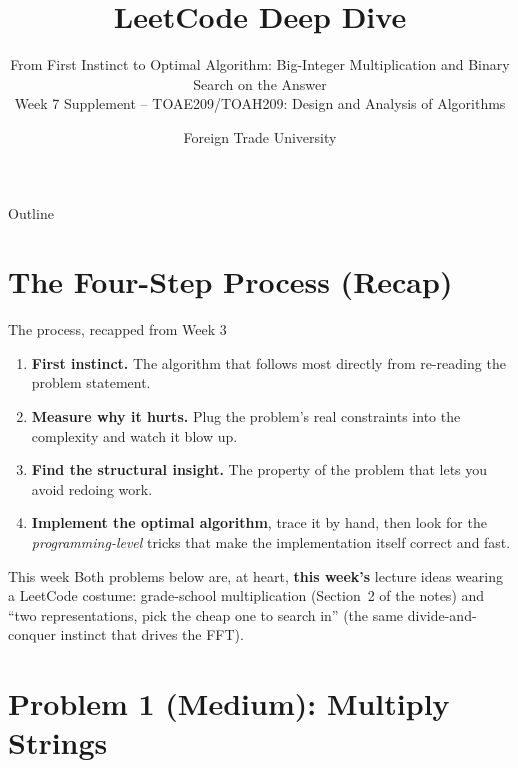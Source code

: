 \documentclass[11pt,aspectratio=169]{beamer}
\title{LeetCode Deep Dive}
\subtitle{From First Instinct to Optimal Algorithm: Big-Integer Multiplication and Binary
Search on the Answer\\
\small Week 7 Supplement -- TOAE209/TOAH209: Design and Analysis of Algorithms}
\author{Foreign Trade University}
\date{}
\begin{document}
\begin{frame}
  \titlepage
\end{frame}

\begin{frame}{Outline}
  \tableofcontents
\end{frame}

\section{The Four-Step Process (Recap)}

\begin{frame}{The process, recapped from Week 3}
  \begin{enumerate}
    \item \textbf{First instinct.} The algorithm that follows most directly from
    re-reading the problem statement.
    \item \textbf{Measure why it hurts.} Plug the problem's real constraints into the
    complexity and watch it blow up.
    \item \textbf{Find the structural insight.} The property of the problem that lets
    you avoid redoing work.
    \item \textbf{Implement the optimal algorithm}, trace it by hand, then look for the
    \emph{programming-level} tricks that make the implementation itself correct and fast.
  \end{enumerate}
  \begin{alertblock}{This week}
    Both problems below are, at heart, \textbf{this week's} lecture ideas wearing a
    LeetCode costume: grade-school multiplication (Section~2 of the notes) and
    ``two representations, pick the cheap one to search in'' (the same
    divide-and-conquer instinct that drives the FFT).
  \end{alertblock}
\end{frame}

\section{Problem 1 (Medium): Multiply Strings}
\end{document}
